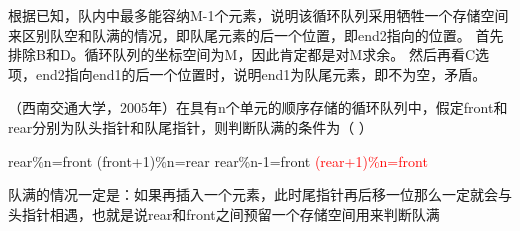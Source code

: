 \begin{solution}根据已知，队内中最多能容纳M-1个元素，说明该循环队列采用牺牲一个存储空间来区别队空和队满的情况，即队尾元素的后一个位置，即end2指向的位置。
首先排除B和D。循环队列的坐标空间为M，因此肯定都是对M求余。
然后再看C选项，end2指向end1的后一个位置时，说明end1为队尾元素，即不为空，矛盾。
\end{solution}
\question （西南交通大学，2005年）在具有n个单元的顺序存储的循环队列中，假定front和rear分别为队头指针和队尾指针，则判断队满的条件为（
）
\par\twoch
{rear\%n=front}
{(front+1)\%n=rear}
{rear\%n-1=front}
{\textcolor{red}{(rear+1)\%n=front}}

\begin{solution}
队满的情况一定是：如果再插入一个元素，此时尾指针再后移一位那么一定就会与头指针相遇，也就是说rear和front之间预留一个存储空间用来判断队满
\end{solution}
